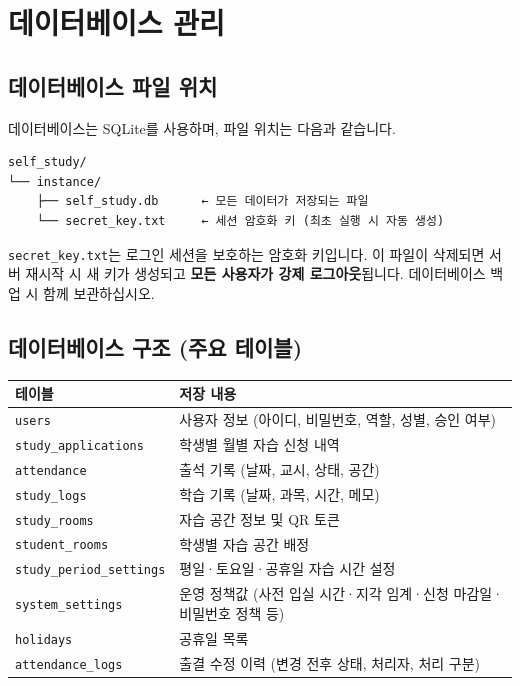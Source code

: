 \documentclass[a4paper,12pt]{article}
\begin{document}
\section{데이터베이스 관리}

\subsection{데이터베이스 파일 위치}

데이터베이스는 SQLite를 사용하며, 파일 위치는 다음과 같습니다.

\begin{lstlisting}
self_study/
└── instance/
    ├── self_study.db      ← 모든 데이터가 저장되는 파일
    └── secret_key.txt     ← 세션 암호화 키 (최초 실행 시 자동 생성)
\end{lstlisting}

\begin{warnbox}
  \texttt{secret\_key.txt}는 로그인 세션을 보호하는 암호화 키입니다.
  이 파일이 삭제되면 서버 재시작 시 새 키가 생성되고 \textbf{모든 사용자가 강제 로그아웃}됩니다.
  데이터베이스 백업 시 함께 보관하십시오.
\end{warnbox}

\subsection{데이터베이스 구조 (주요 테이블)}

\begin{center}
\begin{tabularx}{\textwidth}{lX}
\toprule
\textbf{테이블} & \textbf{저장 내용} \\
\midrule
\texttt{users} & 사용자 정보 (아이디, 비밀번호, 역할, 성별, 승인 여부) \\
\texttt{study\_applications} & 학생별 월별 자습 신청 내역 \\
\texttt{attendance} & 출석 기록 (날짜, 교시, 상태, 공간) \\
\texttt{study\_logs} & 학습 기록 (날짜, 과목, 시간, 메모) \\
\texttt{study\_rooms} & 자습 공간 정보 및 QR 토큰 \\
\texttt{student\_rooms} & 학생별 자습 공간 배정 \\
\texttt{study\_period\_settings} & 평일·토요일·공휴일 자습 시간 설정 \\
\texttt{system\_settings} & 운영 정책값 (사전 입실 시간·지각 임계·신청 마감일·비밀번호 정책 등) \\
\texttt{holidays} & 공휴일 목록 \\
\texttt{attendance\_logs} & 출결 수정 이력 (변경 전후 상태, 처리자, 처리 구분) \\
\bottomrule
\end{tabularx}
\end{center}
\end{document}
